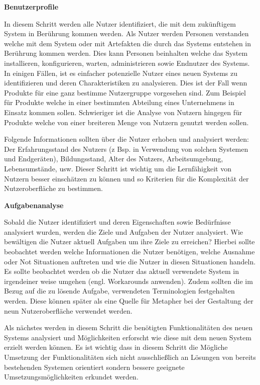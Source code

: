 \vspace{5mm}
\textbf{Benutzerprofile}\label{userprofile}  
 
\cite[S.~73]{Nielsen1994} In diesem Schritt werden alle Nutzer identifiziert, die mit dem zukünftigem System in Berührung kommen werden. Als Nutzer werden Personen verstanden welche mit dem System oder mit Artefakten die durch das Systems entstehen in Berührung kommen werden. Dies kann Personen beinhalten welche das System installieren, konfigurieren, warten, administrieren sowie Endnutzer des Systems. In einigen Fällen, ist es einfacher potenzielle Nutzer eines neuen  Systems zu identifizieren und deren Charakteristiken zu analysieren. Dies ist der Fall wenn Produkte für eine ganz bestimme Nutzergruppe vorgesehen sind. 
Zum Beispiel für Produkte welche in einer bestimmten Abteilung eines Unternehmens in Einsatz kommen sollen. Schwieriger ist die Analyse von Nutzern hingegen für Produkte welche von einer breiteren Menge von Nutzern genutzt werden sollen. 

Folgende Informationen sollten über die Nutzer erhoben und analysiert werden: Der Erfahrungsstand des Nutzers (z Bsp. in Verwendung von solchen Systemen und Endgeräten), Bildungsstand, Alter des Nutzers, Arbeitsumgebung, Lebensumstände, usw. Dieser Schritt ist wichtig um die Lernfähigkeit von Nutzern besser einschätzen zu können und so Kriterien für die Komplexität der Nutzeroberfläche zu bestimmen.

\textbf{Aufgabenanalyse}\label{task_anlyse}  

\cite[S.~75]{Nielsen1994} Sobald die Nutzer identifiziert und deren Eigenschaften sowie Bedürfnisse analysiert wurden, werden die Ziele und Aufgaben der Nutzer analysiert. Wie bewältigen die Nutzer aktuell Aufgaben um ihre Ziele zu erreichen? Hierbei sollte beobachtet werden welche Informationen die Nutzer benötigen, welche Ausnahme oder Not Situationen auftreten und wie die Nutzer in diesen Situationen handeln. 
Es sollte beobachtet werden ob die Nutzer das aktuell verwendete System in irgendeiner weise umgehen (engl. Workarounds anwenden). Zudem sollten die im Bezug auf die zu lösende Aufgabe, verwendeten 
Terminologien festgehalten werden. Diese können später als eine Quelle für Metapher bei der Gestaltung der neun Nutzeroberfläche verwendet werden. 

\cite[S.~77]{Nielsen1994} Als nächstes werden in diesem Schritt die benötigten Funktionalitäten des neuen Systems analysiert und Möglichkeiten erforscht wie diese mit dem neuen System erzielt werden können. 
Es ist wichtig dass in diesem Schritt die Mögliche Umsetzung der Funktionalitäten sich nicht ausschließlich an Lösungen von bereits bestehenden Systemen orientiert sondern 
bessere geeignete Umsetzungsmöglichkeiten erkundet werden.

